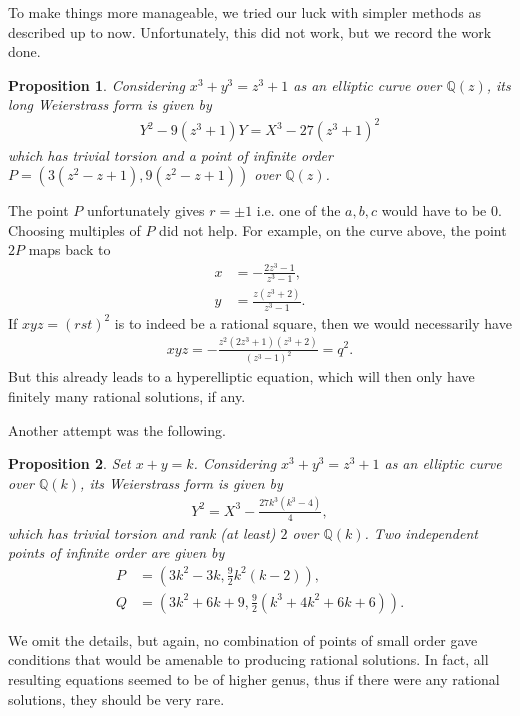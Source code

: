 \documentclass{amsart}
\newtheorem{prop}{Proposition}
\begin{document}
To make things more manageable, we tried our luck with simpler methods as described up to now. Unfortunately, this did not work, but we record the work done.

\begin{prop}
    Considering $x^3+y^3=z^3+1$ as an elliptic curve over $\mathbb{Q}(z)$, its long Weierstrass form is given by
    \begin{align*}
        Y^2 -9(z^3+1)Y = X^3-27(z^3+1)^2
    \end{align*}
    which has trivial torsion and a point of infinite order $P =(3(z^2-z+1), 9(z^2-z+1))$ over $\mathbb{Q}(z)$.
\end{prop}
The point $P$ unfortunately gives $r=\pm 1$ i.e. one of the $a,b,c$ would have to be $0$. Choosing multiples of $P$ did not help. For example, on the curve above, the point $2P$ maps back to
\begin{align*}
    x &= -\frac{2z^3-1}{z^3-1},\\
    y &= \frac{z(z^3+2)}{z^3-1}.
\end{align*}
If $xyz=(rst)^2$ is to indeed be a rational square, then we would necessarily have
\begin{align*}
    xyz= -\frac{z^2(2z^3+1)(z^3+2)}{(z^3-1)^2} = q^2.
\end{align*}
But this already leads to a hyperelliptic equation, which will then only have finitely many rational solutions, if any. 

Another attempt was the following.
\begin{prop}
    Set $x+y=k$. Considering $x^3+y^3=z^3+1$ as an elliptic curve over $\mathbb{Q}(k)$, its Weierstrass form is given by
    \begin{align*}
    Y^2 = X^3 - \frac{27k^3(k^3-4)}{4},
    \end{align*}
    which has trivial torsion and rank (at least) $2$ over $\mathbb{Q}(k)$. Two independent points of infinite order are given by
    \begin{align*}
        P &= (3k^2-3k, \frac{9}{2}k^2(k-2)),\\
        Q &= (3k^2+6k+9, \frac{9}{2}(k^3+4k^2+6k+6)).
    \end{align*}
\end{prop}
We omit the details, but again, no combination of points of small order gave conditions that would be amenable to producing rational solutions. In fact, all resulting equations seemed to be of higher genus, thus if there were any rational solutions, they should be very rare. 
\end{document}
